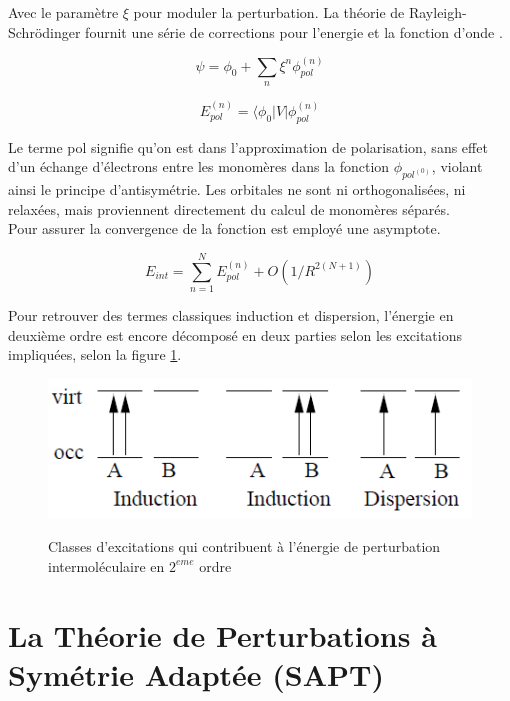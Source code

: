 Avec le paramètre $\xi$ pour moduler la perturbation. La théorie de Rayleigh-Schr\"{o}dinger fournit une série de corrections pour l'energie et la fonction d'onde \cite{chipman1973perturbation}.

\begin{equation}
\psi = \phi_{0} + \sum_{n} \xi^{n} \phi_{pol}^{(n)}
\end{equation}

\begin{equation}
E_{pol}^{(n)} = \langle \phi_{0}|V| \phi_{pol}^{(n)}
\end{equation}

Le terme \og pol \fg{} signifie qu’on est dans l'approximation de polarisation, sans effet d'un échange d’électrons entre les monomères dans la fonction $\phi_{pol^{(0)}}$, violant ainsi le principe d’antisymétrie. Les orbitales ne sont ni orthogonalisées, ni relaxées, mais proviennent directement du calcul de monomères séparés.\\

Pour assurer la convergence de la fonction est employé une asymptote. 

\begin{equation}
E_{int} = \sum_{n=1}^{N} E_{pol}^{(n)} + O(1/R^{2 (N+1)})
\end{equation}

 Pour retrouver des termes classiques induction et dispersion, l'énergie en deuxième ordre est encore décomposé en deux parties selon les excitations impliquées, selon la figure \ref{figExc}.

\singlespacing
\begin{figure}[H]
	\centering
	\includegraphics[scale=0.7]{image/D-I} \label{figExc}
	\caption[Les excitations contribuent à l'énergie
	de perturbation intermoléculaire en $2^{eme}$ ordre]{Classes d'excitations qui contribuent à l'énergie
		de perturbation intermoléculaire en $2^{eme}$ ordre}
\end{figure}



\section{La Théorie de Perturbations à Symétrie Adaptée (SAPT)}

